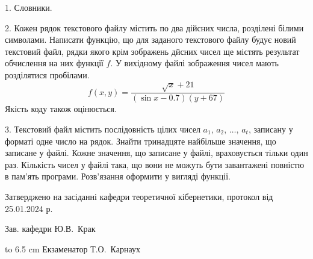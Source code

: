 \documentclass[12pt, ukrainian]{article}
\begin{document}
{%
1. Словники.%
\par
\vspace{2mm}

2. Кожен рядок текстового файлу містить по два дійсних числа, розділені білими символами.
Написати функцію, що для заданого текстового файлу будує новий текстовий файл, рядки якого крім зображень дйсних чисел ще містять результат обчислення на них функції $f$. У вихідному файлі зображення чисел мають розділятися пробілами. 
$$f(x, y) =\frac{\sqrt x + 21}{(\sin x - 0.7) (y + 67)}$$ 
Якість коду також оцінюється.

\par
\vspace{2mm}

3. Текстовий файл містить послідовність цілих чисел $a_1$, $a_2$, $\ldots$, $a_t$, записану у форматі одне число на рядок. Знайти тринадцяте найбільше значення, що записане у файлі. Кожне значення, що записане у файлі, враховується тільки один раз. Кількість чисел у файлі така, що вони не можуть бути завантажені повністю в пам'ять програми. Розв'язання оформити у вигляді функції.

}
{\smallskip\smallskip \begin {scriptsize} Затверджено на засіданні кафедри теоретичної кібернетики, протокол   від   25.01.2024 р.\par\smallskip\smallskip\smallskip\smallskip
{\parbox {6.5 cm} {Зав. кафедри \dotfill Ю.В.~Крак}}\hspace {0.7cm} {\hbox to 6.5 cm { Екзаменатор \dotfill Т.О.~Карнаух}} \end{scriptsize}}
\newpage
\end{document}
